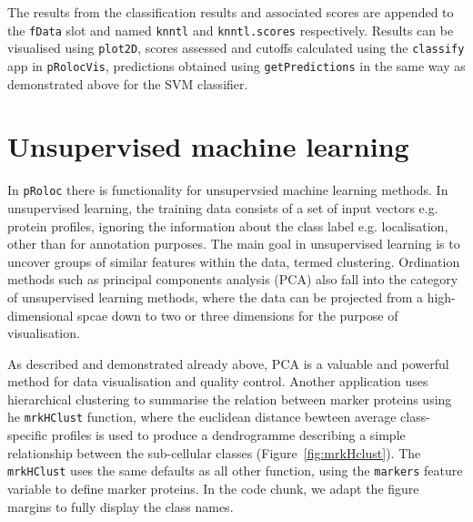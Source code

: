 \begin{knitrout}
\begin{kframe}
\begin{alltt}
 \hlkwb{<-}     \hlstd{=} \hlstd{(}\hlstd{,} \hlstd{))}
\end{alltt}
\end{kframe}
\end{knitrout}

The results from the classification results and associated scores are
appended to the \texttt{fData} slot and named \texttt{knntl} and
\texttt{knntl.scores} respectively. Results can be visualised using
\texttt{plot2D}, scores assessed and cutoffs calculated using the
\texttt{classify} app in \texttt{pRolocVis}, predictions obtained
using \texttt{getPredictions} in the same way as demonstrated above
for the SVM classifier.

\section*{Unsupervised machine learning}

In \texttt{pRoloc} there is functionality for unsupervsied machine
learning methods. In unsupervised learning, the training data consists
of a set of input vectors e.g. protein profiles, ignoring the
information about the class label e.g. localisation, other than for
annotation purposes. The main goal in unsupervised learning is to
uncover groups of similar features within the data, termed
clustering. Ordination methods such as principal components analysis
(PCA) also fall into the category of unsupervised learning methods,
where the data can be projected from a high-dimensional spcae down to
two or three dimensions for the purpose of visualisation.

As described and demonstrated already above, PCA is a valuable and
powerful method for data visualisation and quality control. Another
application uses hierarchical clustering to summarise the relation
between marker proteins using he \texttt{mrkHClust} function, where
the euclidean distance bewteen average class-specific profiles is used
to produce a dendrogramme describing a simple relationship between the
sub-cellular classes (Figure~\ref{fig:mrkHclust}). The
\texttt{mrkHClust} uses the same defaults as all other function, using
the \texttt{markers} feature variable to define marker proteins. In
the code chunk, we adapt the figure margins to fully display the class
names.

